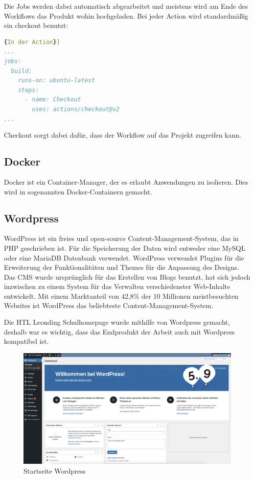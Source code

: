 Die Jobs werden dabei automatisch abgearbeitet und meistens wird am Ende des Workflows das Produkt wohin hochgeladen.
Bei jeder Action wird standardmäßig ein checkout benutzt:

\begin{lstlisting}[language=yaml,label={lst:checkout},caption={In der Action}]{In der Action}]
...
jobs:
  build:
    runs-on: ubuntu-latest
    steps:
      - name: Checkout
        uses: actions/checkout@v2
...
\end{lstlisting}

Checkout sorgt dabei dafür, dass der Workflow auf das Projekt zugreifen kann.

\subsection{Docker}
Docker ist ein Container-Manager, der es erlaubt Anwendungen zu isolieren.
Dies wird in sogenannten Docker-Containern gemacht.

\subsection{Wordpress}
WordPress ist ein freies und open-source Content-Management-System, das in PHP geschrieben ist.
Für die Speicherung der Daten wird entweder eine MySQL oder eine MariaDB Datenbank verwendet.
WordPress verwendet Plugins für die Erweiterung der Funktionalitäten und Themes für die Anpassung des Designs.
Das CMS wurde ursprünglich für das Erstellen von Blogs benutzt, hat sich jedoch inzwischen zu einem System für das Verwalten verschiedenster Web-Inhalte entwickelt.
Mit einem Marktanteil von 42,8\% der 10 Millionen meistbesuchten Websites ist WordPress das beliebteste Content-Management-System.

Die HTL Leonding Schulhomepage wurde mithilfe von Wordpress gemacht, deshalb war es wichtig, dass das Endprodukt der Arbeit auch mit Wordpress kompatibel ist.


\begin{figure}[hbt!]
    \centering
    \includegraphics[scale=0.2]{pics/wordpresshome}
    \caption{Startseite Wordpress}
    \label{fig:impl:wordpresshome}
\end{figure}


